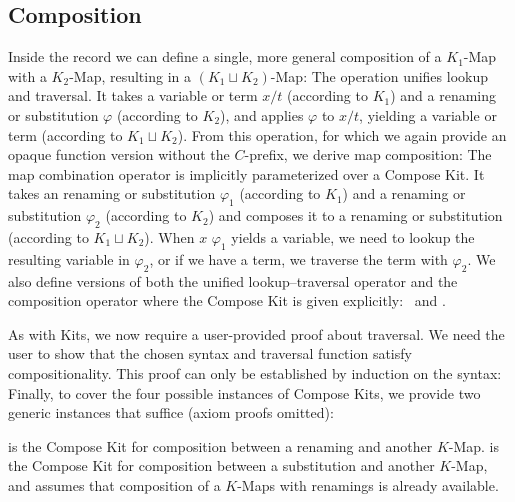 \documentclass[screen,nonacm]{acmart}
\begin{document}
\subsection{Composition}\label{sec:ags-com}
Inside the  record we can define a single, more
general composition of a $K_1$-Map with a $K_2$-Map, resulting in a $(K_1
      \sqcup K_2)$-Map: \AComposeKit{}The operation  unifies
lookup and traversal. It takes a variable or term $x/t$ (according to $K_1$)
and a renaming or substitution $\varphi$ (according to $K_2$), and applies
$\varphi$ to $x/t$, yielding a variable or term (according to $K_1 \sqcup
      K_2$). From this operation, for which we again provide an opaque function
version without the $C$-prefix, we derive map composition: \ACompDef{}The map
combination operator is implicitly parameterized over a Compose Kit. It takes
an renaming or substitution $\varphi_1$ (according to $K_1$) and a renaming or
substitution $\varphi_2$ (according to $K_2$) and composes it to a renaming or
substitution (according to $K_1 \sqcup K_2$). When $x$ \AgdaFunction{\&}
$\varphi_1$ yields a variable, we need to lookup the resulting variable in
$\varphi_2$, or if we have a term, we traverse the term with $\varphi_2$. We
also define versions of both the unified lookup–traversal operator and the
composition operator where the Compose Kit is given explicitly: \ACompExp \ and
\ALoAExp.

As with Kits, we now require a user-provided proof about traversal. We need the
user to show that the chosen syntax and traversal function satisfy
compositionality. This proof can only be established by induction on the
syntax: \ACompositionality{}Finally, to cover the four possible instances of
Compose Kits, we provide two generic instances that suffice (axiom proofs
omitted):

\begin{minipage}{0.38\linewidth}
      \raggedright{}
      \AInstanceCRen{}
\end{minipage}
\begin{minipage}{0.58\linewidth}
      \raggedright{}
      \AInstanceCSub{}
\end{minipage}

\noindent {} is the Compose Kit for composition between a renaming and another $K$-Map.
 is the Compose Kit for composition between a substitution and another $K$-Map, and assumes that composition of a $K$-Maps with renamings is already available.
\end{document}
